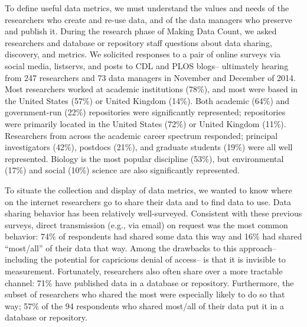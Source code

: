 \documentclass[english]{article}
\begin{document}


To define useful data metrics, we must understand the values and needs of the researchers who create and re-use data, and of the data managers who preserve and publish it.
During the research phase of Making Data Count, we asked researchers and database or repository staff questions about data sharing, discovery, and metrics.
We solicited responses to a pair of online surveys via social media, listservs, and posts to CDL and PLOS blogs-- ultimately hearing from 247 researchers and 73 data managers in November and December of 2014.
Most researchers worked at academic institutions (78\%), and most were based in the United States (57\%) or United Kingdom (14\%).
Both academic (64\%) and government-run (22\%) repositories were significantly represented; repositories were primarily located in the United States (72\%) or United Kingdom (11\%).
Researchers from across the academic career spectrum responded; principal investigators (42\%), postdocs (21\%), and graduate students (19\%) were all well represented. 
Biology is the most popular discipline (53\%), but environmental (17\%) and social (10\%) science are also significantly represented. 



To situate the collection and display of data metrics, we wanted to know where on the internet researchers go to share their data and to find data to use. 
Data sharing behavior has been relatively well-surveyed\cite{tenopir_data_2011, akers_disciplinary_2013, wallis_if_2013, aydinoglu_data_2014, kratz_researcher_2015}. 
Consistent with these previous surveys, direct transmission (e.g., via email) on request was the most common behavior: 74\% of respondents had shared some data this way and 16\% had shared ``most/all'' of their data that way.
Among the drawbacks to this approach-- including the potential for capricious denial of access-- is that it is invisible to measurement. 
Fortunately, researchers also often share over a more tractable channel: 71\% have published data in a database or repository.
Furthermore, the subset of researchers who shared the most were especially likely to do so that way; 57\% of the 94 respondents who shared most/all of their data put it in a database or repository.
\end{document}
